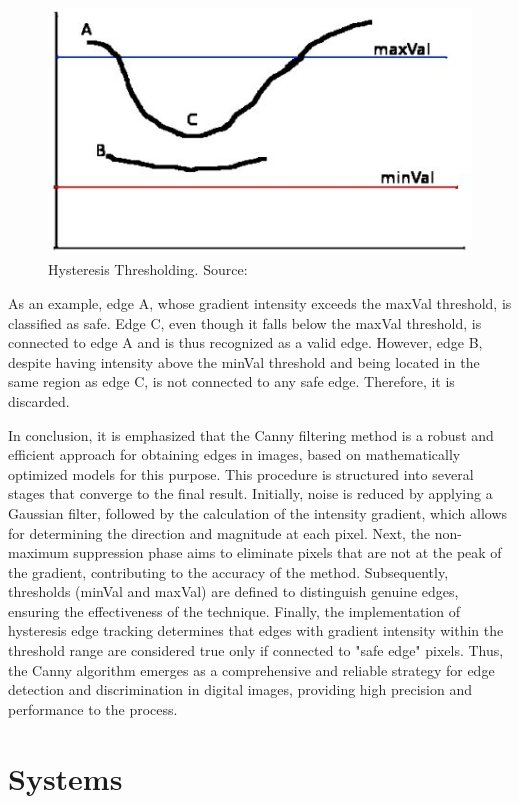 \begin{figure}[ht!]
\centering
\includegraphics[width=.65\linewidth]{images/Development/chap3/hysteresis.jpg}
\caption{Hysteresis Thresholding. Source: \cite{canny_opencv_nodate}}
\label{fig: hysteresis}
\end{figure}

As an example, edge A, whose gradient intensity exceeds the maxVal threshold, is classified as safe. Edge C, even though it falls below the maxVal threshold, is connected to edge A and is thus recognized as a valid edge. However, edge B, despite having intensity above the minVal threshold and being located in the same region as edge C, is not connected to any safe edge. Therefore, it is discarded.

In conclusion, it is emphasized that the Canny filtering method is a robust and efficient approach for obtaining edges in images, based on mathematically optimized models for this purpose. This procedure is structured into several stages that converge to the final result. Initially, noise is reduced by applying a Gaussian filter, followed by the calculation of the intensity gradient, which allows for determining the direction and magnitude at each pixel. Next, the non-maximum suppression phase aims to eliminate pixels that are not at the peak of the gradient, contributing to the accuracy of the method. Subsequently, thresholds (minVal and maxVal) are defined to distinguish genuine edges, ensuring the effectiveness of the technique. Finally, the implementation of hysteresis edge tracking determines that edges with gradient intensity within the threshold range are considered true only if connected to "safe edge" pixels. Thus, the Canny algorithm emerges as a comprehensive and reliable strategy for edge detection and discrimination in digital images, providing high precision and performance to the process.

\section{ Systems}\label{section: System}

